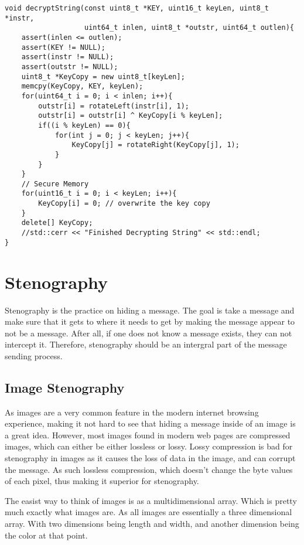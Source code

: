 \documentclass[12pt]{article}
\begin{document}
    \singlespacing
    \begin{lstlisting}[caption=C++ Decryption Code]
void decryptString(const uint8_t *KEY, uint16_t keyLen, uint8_t *instr,
                   uint64_t inlen, uint8_t *outstr, uint64_t outlen){
    assert(inlen <= outlen);
    assert(KEY != NULL);
    assert(instr != NULL);
    assert(outstr != NULL);
    uint8_t *KeyCopy = new uint8_t[keyLen];
    memcpy(KeyCopy, KEY, keyLen);
    for(uint64_t i = 0; i < inlen; i++){
        outstr[i] = rotateLeft(instr[i], 1);
        outstr[i] = outstr[i] ^ KeyCopy[i % keyLen];
        if((i % keyLen) == 0){
            for(int j = 0; j < keyLen; j++){
                KeyCopy[j] = rotateRight(KeyCopy[j], 1);
            }
        }
    }
    // Secure Memory
    for(uint16_t i = 0; i < keyLen; i++){
        KeyCopy[i] = 0; // overwrite the key copy
    }
    delete[] KeyCopy;
    //std::cerr << "Finished Decrypting String" << std::endl;
}
    \end{lstlisting}
    \doublespacing
 
\section{Stenography}
  Stenography is the practice on hiding a message. The goal is take
  a message and make sure that it gets to where it needs to get by
  making the message appear to not be a message. After all, if one
  does not know a message exists, they can not intercept it. Therefore,
  stenography should be an intergral part of the message sending process.
  
  \subsection{Image Stenography}
    As images are a very common feature in the modern internet browsing
    experience, making it not hard to see that hiding a message inside 
    of an image is a great idea. However, most images found in 
    modern web pages are compressed images, which can either be either
    lossless or lossy. Lossy compression is bad for stenography in 
    images as it causes the loss of data in the image, and can
    corrupt the message. As such lossless compression, which doesn't 
    change the byte values of each pixel, thus making it superior 
    for stenography.
    
    The easist way to think of images is as a multidimensional array.
    Which is pretty much exactly what images are. As all images are
    essentially a three dimensional array. With two dimensions being
    length and width, and another dimension being the color at that 
    point.
\end{document}
